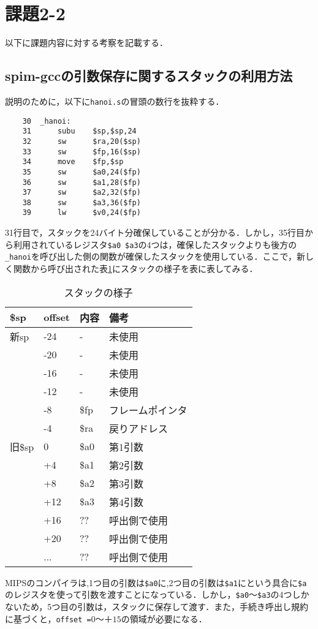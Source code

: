 \documentclass[a4j,11pt]{jarticle}
\begin{document}
 \section{課題2-2}
以下に課題内容に対する考察を記載する．
  \subsection{spim-gccの引数保存に関するスタックの利用方法}
説明のために，以下に\verb|hanoi.s|の冒頭の数行を抜粋する．
\begin{verbatim}
    30	_hanoi:
    31		subu	$sp,$sp,24
    32		sw	    $ra,20($sp)
    33		sw	    $fp,16($sp)
    34		move	$fp,$sp
    35		sw	    $a0,24($fp)
    36		sw	    $a1,28($fp)
    37		sw	    $a2,32($fp)
    38		sw	    $a3,36($fp)
    39		lw	    $v0,24($fp)
\end{verbatim}
31行目で，スタックを24バイト分確保していることが分かる．しかし，35行目から利用されているレジスタ\verb|$a0|~\verb|$a3|の4つは，確保したスタックよりも後方の\verb|_hanoi|を呼び出した側の関数が確保したスタックを使用している．ここで，新しく関数から呼び出された表\ref{tab:stack}にスタックの様子を表に表してみる．
\begin{table}[t]
\label{tab:stack}
\centering
\begin{tabular}{|l|l|l|l|}
\hline
\$sp  & offset & 内容   & 備考       \\ \hline
新sp   & -24    & -    & 未使用      \\ \hline
      & -20    & -    & 未使用      \\ \hline
      & -16    & -    & 未使用      \\ \hline
      & -12    & -    & 未使用      \\ \hline
      & -8     & \$fp & フレームポインタ \\ \hline
      & -4     & \$ra & 戻りアドレス   \\ \hline
旧\$sp & 0      & \$a0 & 第1引数     \\ \hline
      & +4     & \$a1 & 第2引数     \\ \hline
      & +8     & \$a2 & 第3引数     \\ \hline
      & +12    & \$a3 & 第4引数     \\ \hline
      & +16    & ??   & 呼出側で使用   \\ \hline
      & +20    & ??   & 呼出側で使用   \\ \hline
      & ...    & ??   & 呼出側で使用   \\ \hline
\end{tabular}
\caption{スタックの様子}
\end{table}
MIPSのコンパイラは,1つ目の引数は\verb|$a0|に,2つ目の引数は\verb|$a1|にという具合に\verb|$a|のレジスタを使って引数を渡すことになっている．しかし，\verb|$a0|〜\verb|$a3|の4つしかないため，5つ目の引数は，スタックに保存して渡す．また，手続き呼出し規約に基づくと，\verb|offset =|$0$〜＋$15$の領域が必要になる．
\end{document}
